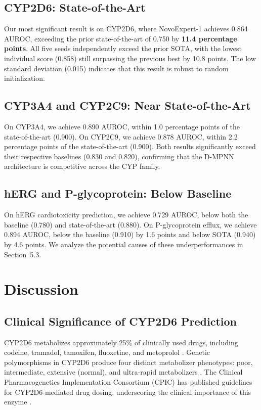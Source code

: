 \documentclass[11pt]{article}
\begin{document}
\subsection{CYP2D6: State-of-the-Art}

Our most significant result is on CYP2D6, where NovoExpert-1 achieves 0.864 AUROC, exceeding the prior state-of-the-art of 0.750 by \textbf{11.4 percentage points}. All five seeds independently exceed the prior SOTA, with the lowest individual score (0.858) still surpassing the previous best by 10.8 points. The low standard deviation (0.015) indicates that this result is robust to random initialization.

\subsection{CYP3A4 and CYP2C9: Near State-of-the-Art}

On CYP3A4, we achieve 0.890 AUROC, within 1.0 percentage points of the state-of-the-art (0.900). On CYP2C9, we achieve 0.878 AUROC, within 2.2 percentage points of the state-of-the-art (0.900). Both results significantly exceed their respective baselines (0.830 and 0.820), confirming that the D-MPNN architecture is competitive across the CYP family.

\subsection{hERG and P-glycoprotein: Below Baseline}

On hERG cardiotoxicity prediction, we achieve 0.729 AUROC, below both the baseline (0.780) and state-of-the-art (0.880). On P-glycoprotein efflux, we achieve 0.894 AUROC, below the baseline (0.910) by 1.6 points and below SOTA (0.940) by 4.6 points. We analyze the potential causes of these underperformances in Section~5.3.

\section{Discussion}

\subsection{Clinical Significance of CYP2D6 Prediction}

CYP2D6 metabolizes approximately 25\% of clinically used drugs, including codeine, tramadol, tamoxifen, fluoxetine, and metoprolol \citep{zanger2013cytochrome}. Genetic polymorphisms in CYP2D6 produce four distinct metabolizer phenotypes: poor, intermediate, extensive (normal), and ultra-rapid metabolizers \citep{gaedigk2017pharmacogene}. The Clinical Pharmacogenetics Implementation Consortium (CPIC) has published guidelines for CYP2D6-mediated drug dosing, underscoring the clinical importance of this enzyme \citep{crews2014clinical}.
\end{document}
